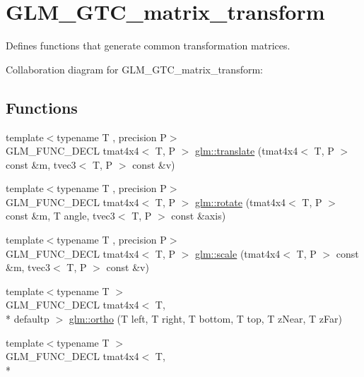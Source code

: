 \hypertarget{group__gtc__matrix__transform}{\section{G\-L\-M\-\_\-\-G\-T\-C\-\_\-matrix\-\_\-transform}
\label{group__gtc__matrix__transform}
}


Defines functions that generate common transformation matrices.  


Collaboration diagram for G\-L\-M\-\_\-\-G\-T\-C\-\_\-matrix\-\_\-transform\-:
\subsection*{Functions}
\begin{DoxyCompactItemize}
\item 
{\footnotesize template$<$typename T , precision P$>$ }\\G\-L\-M\-\_\-\-F\-U\-N\-C\-\_\-\-D\-E\-C\-L tmat4x4$<$ T, P $>$ \hyperlink{group__gtc__matrix__transform_gaee134ab77c6c5548a6ebf4e8e476c6ed}{glm\-::translate} (tmat4x4$<$ T, P $>$ const \&m, tvec3$<$ T, P $>$ const \&v)
\item 
{\footnotesize template$<$typename T , precision P$>$ }\\G\-L\-M\-\_\-\-F\-U\-N\-C\-\_\-\-D\-E\-C\-L tmat4x4$<$ T, P $>$ \hyperlink{group__gtc__matrix__transform_ga161b1df124348f232d994ba7958e4815}{glm\-::rotate} (tmat4x4$<$ T, P $>$ const \&m, T angle, tvec3$<$ T, P $>$ const \&axis)
\item 
{\footnotesize template$<$typename T , precision P$>$ }\\G\-L\-M\-\_\-\-F\-U\-N\-C\-\_\-\-D\-E\-C\-L tmat4x4$<$ T, P $>$ \hyperlink{group__gtc__matrix__transform_ga8f062fcc07e2445500793f2803afebb0}{glm\-::scale} (tmat4x4$<$ T, P $>$ const \&m, tvec3$<$ T, P $>$ const \&v)
\item 
{\footnotesize template$<$typename T $>$ }\\G\-L\-M\-\_\-\-F\-U\-N\-C\-\_\-\-D\-E\-C\-L tmat4x4$<$ T, \\*
defaultp $>$ \hyperlink{group__gtc__matrix__transform_ga65280251de6e38580110a0577a43d8f8}{glm\-::ortho} (T left, T right, T bottom, T top, T z\-Near, T z\-Far)
\item 
{\footnotesize template$<$typename T $>$ }\\G\-L\-M\-\_\-\-F\-U\-N\-C\-\_\-\-D\-E\-C\-L tmat4x4$<$ T, \\*

\end{DoxyCompactItemize}
